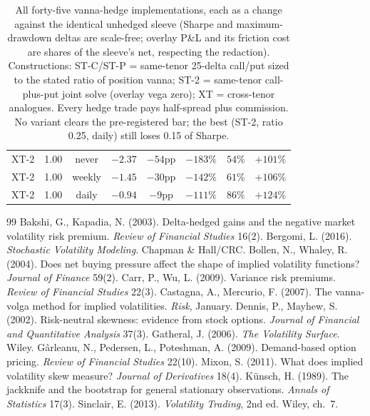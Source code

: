 \documentclass[11pt]{article}
\begin{document}
\begin{table}[h]
\begin{tabular}{llcccccc}
XT-2 & 1.00 & never & $-2.37$ & $-54$pp & $-183\%$ & $54\%$ & $+101\%$ \\
XT-2 & 1.00 & weekly & $-1.45$ & $-30$pp & $-142\%$ & $61\%$ & $+106\%$ \\
XT-2 & 1.00 & daily & $-0.94$ & $-9$pp & $-111\%$ & $86\%$ & $+124\%$ \\
\bottomrule\end{tabular}
\caption{All forty-five vanna-hedge implementations, each as a change against the identical
unhedged sleeve (Sharpe and maximum-drawdown deltas are scale-free; overlay P\&L and its
friction cost are shares of the sleeve's net, respecting the redaction). Constructions:
ST-C/ST-P = same-tenor 25-delta call/put sized to the stated ratio of position vanna; ST-2 =
same-tenor call-plus-put joint solve (overlay vega zero); XT = cross-tenor analogues. Every
hedge trade pays half-spread plus commission. No variant clears the pre-registered bar; the
best (ST-2, ratio 0.25, daily) still loses 0.15 of Sharpe.}
\label{tab:hedge45}\end{table}

\begin{thebibliography}{99}\small
{} Bakshi, G., Kapadia, N. (2003). Delta-hedged gains
and the negative market volatility risk premium. \emph{Review of Financial Studies} 16(2).
 Bergomi, L. (2016). \emph{Stochastic Volatility Modeling}.
Chapman \& Hall/CRC.
 Bollen, N., Whaley, R. (2004). Does net buying pressure
affect the shape of implied volatility functions? \emph{Journal of Finance} 59(2).
 Carr, P., Wu, L. (2009). Variance risk premiums.
\emph{Review of Financial Studies} 22(3).
 Castagna, A., Mercurio, F. (2007). The vanna-volga
method for implied volatilities. \emph{Risk}, January.
 Dennis, P., Mayhew, S. (2002). Risk-neutral skewness:
evidence from stock options. \emph{Journal of Financial and Quantitative Analysis} 37(3).
 Gatheral, J. (2006). \emph{The Volatility Surface}. Wiley.
 G\^arleanu, N., Pedersen, L., Poteshman, A. (2009).
Demand-based option pricing. \emph{Review of Financial Studies} 22(10).
 Mixon, S. (2011). What does implied volatility skew measure?
\emph{Journal of Derivatives} 18(4).
 K\"unsch, H. (1989). The jackknife and the bootstrap for
general stationary observations. \emph{Annals of Statistics} 17(3).
 Sinclair, E. (2013). \emph{Volatility Trading}, 2nd ed.
Wiley, ch.~7.
\end{thebibliography}
\end{document}
